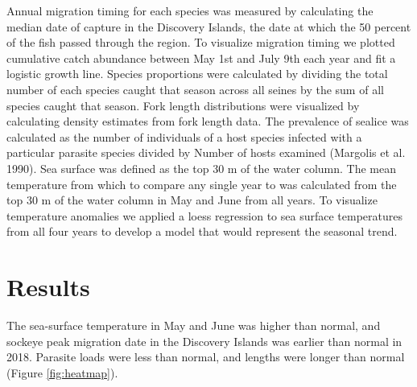 \documentclass[fleqn,10pt]{wlpeerj} %
\begin{document}
Annual migration timing for each species was measured by calculating the
median date of capture in the Discovery Islands, the date at which the
50 percent of the fish passed through the region. To visualize migration
timing we plotted cumulative catch abundance between May 1st and July
9th each year and fit a logistic growth line. Species proportions were
calculated by dividing the total number of each species caught that
season across all seines by the sum of all species caught that season.
Fork length distributions were visualized by calculating density
estimates from fork length data. The prevalence of sealice was
calculated as the number of individuals of a host species infected with
a particular parasite species divided by Number of hosts examined
(Margolis et al. 1990). Sea surface was defined as the top 30 m of the
water column. The mean temperature from which to compare any single year
to was calculated from the top 30 m of the water column in May and June
from all years. To visualize temperature anomalies we applied a loess
regression to sea surface temperatures from all four years to develop a
model that would represent the seasonal trend.

\section*{Results}\label{results}

The sea-surface temperature in May and June was higher than normal, and
sockeye peak migration date in the Discovery Islands was earlier than
normal in 2018. Parasite loads were less than normal, and lengths were
longer than normal (Figure \ref{fig:heatmap}).
\end{document}
